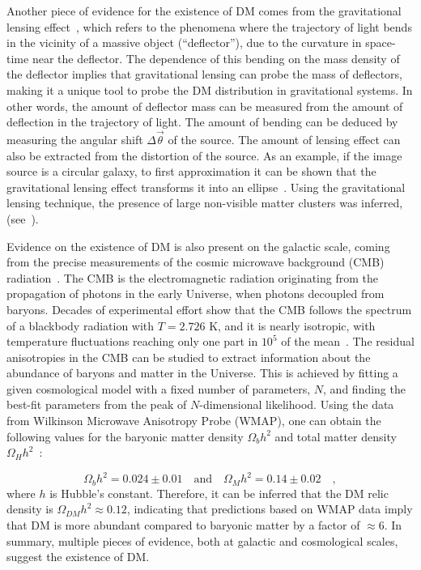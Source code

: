 Another piece of evidence for the existence of DM comes from the gravitational lensing effect~\cite{Mellier:1998pk}, which refers to the
phenomena where the trajectory of light bends in the vicinity of a massive object (``deflector''), due to the curvature in 
space-time near the deflector. The dependence of this bending on the mass density of the deflector implies that gravitational
lensing can probe the mass of deflectors, making it a unique tool to probe the DM distribution in gravitational systems. In other words,
the amount of deflector mass can be measured from the amount of deflection in the trajectory of light. The amount of bending can be
deduced by measuring the angular shift $\Delta\vec{\theta}$ of the source. The amount of lensing effect can also be extracted from
the distortion of the source. As an example, if the image source is a circular galaxy, to first approximation it can be shown that
the gravitational lensing effect transforms it into an ellipse~\cite{Mellier:1998pk}. Using the gravitational lensing technique, the
presence of large non-visible matter clusters was inferred, (see~\cite{1988ApJ...332...75N}).

Evidence on the existence of DM is also present on the galactic scale, coming from the precise measurements of the cosmic
microwave background (CMB) radiation~\cite{Hu:1995kot}. The CMB is the electromagnetic radiation originating from the propagation of photons
in the early Universe, when photons decoupled from baryons. Decades of experimental effort show that the CMB follows 
the spectrum of a blackbody radiation with $T=2.726$ K, and it is nearly isotropic,
with temperature fluctuations reaching only one part in $10^{5}$ of the mean~\cite{Bertone:2004pz}.
The residual anisotropies in the CMB can be studied to extract information about the abundance of baryons and matter in the Universe. 
This is achieved by fitting
a given cosmological model with a fixed number of parameters, $N$, and finding the best-fit parameters from the peak of $N$-dimensional
likelihood. Using the data from Wilkinson Microwave Anisotropy Probe (WMAP), one can obtain the following values for the baryonic matter
density $\Omega_{b} h^{2}$ and total matter density $\Omega_{H} h^{2}$~\cite{Bertone:2004pz}:

\begin{equation}
    \Omega_{b} h^{2} = 0.024 \pm 0.01 \quad \textrm{and} \quad \Omega_{M} h^{2} = 0.14 \pm 0.02 \quad ,
\end{equation}
where $h$ is Hubble's constant. Therefore, it can be inferred that the DM relic density is $\Omega_{DM} h^2 \approx 0.12$, indicating that
predictions based on WMAP data imply that DM is more abundant compared to baryonic matter by a factor of $\approx 6$. In summary, multiple
pieces of evidence, both at galactic and cosmological scales, suggest the existence of DM. 

